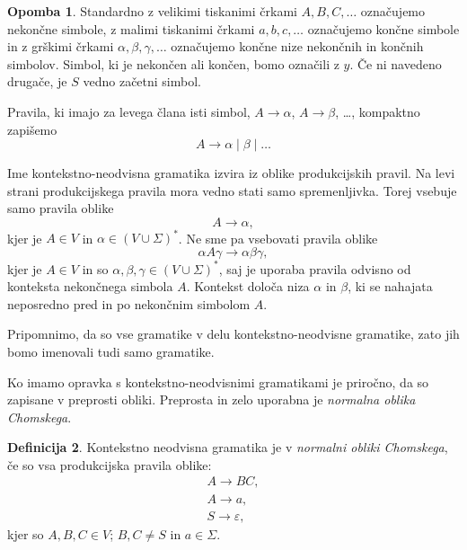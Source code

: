 \documentclass{amsart}
\theoremstyle{definition}
\newtheorem{definicija}{Definicija}[section]
\newtheorem{opomba}[definicija]{Opomba}
\theoremstyle{plain} %
\begin{document}
\begin{opomba}

    Standardno z velikimi tiskanimi črkami $ A, B, C, \ldots $ označujemo nekončne simbole,
    z malimi tiskanimi črkami $ a, b, c, \ldots $ označujemo končne simbole in
    z grškimi črkami $ \alpha, \beta, \gamma, \ldots $ označujemo končne nize
    nekončnih in končnih simbolov. Simbol, ki je nekončen ali končen, bomo označili z $y$.
    Če ni navedeno drugače, je $S$ vedno začetni simbol.

    Pravila, ki imajo za levega člana isti simbol, $ A \rightarrow \alpha $, $ A \rightarrow \beta $, \ldots,
    kompaktno zapišemo
    \[
        A \rightarrow \alpha \mid \beta \mid \ldots
    \]
    
    Ime kontekstno-neodvisna gramatika izvira iz oblike produkcijskih pravil. Na levi
    strani produkcijskega pravila mora vedno stati samo spremenljivka. Torej vsebuje samo
    pravila oblike
    \[
        A \rightarrow \alpha,
    \]
    kjer je  $ A \in V $ in $ \alpha \in ( V \cup \Sigma )^* $. Ne sme pa vsebovati
    pravila oblike
    \[
        \alpha A \gamma \rightarrow \alpha\beta\gamma,
    \]
    kjer je $ A \in V $ in so $ \alpha, \beta, \gamma \in ( V \cup \Sigma )^* $, saj je uporaba
    pravila odvisno od konteksta nekončnega simbola $ A $. Kontekst določa niza $ \alpha $ in $ \beta $,
    ki se nahajata neposredno pred in po nekončnim simbolom $ A $.

    Pripomnimo, da so vse gramatike v delu kontekstno-neodvisne gramatike, zato jih bomo imenovali tudi
    samo gramatike.

\end{opomba}

Ko imamo opravka s kontekstno-neodvisnimi gramatikami je priročno, da so zapisane v preprosti
obliki. Preprosta in zelo uporabna je \textit{normalna oblika Chomskega}.

\begin{definicija}

    Kontekstno neodvisna gramatika je v \textit{normalni obliki Chomskega}, če so vsa produkcijska pravila oblike:
    \begin{gather*}
        A \rightarrow BC, \\
        A \rightarrow a, \\
        S \rightarrow \varepsilon,
    \end{gather*}
    kjer so $ A, B, C \in V $; $ B, C \neq S $ in $ a \in \Sigma $.

\end{definicija}
\end{document}
